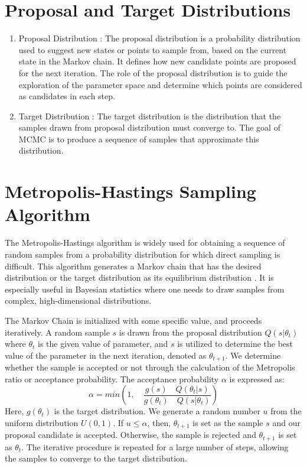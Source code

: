 \documentclass{article}
\begin{document}
\section{Proposal and Target Distributions}

\begin{enumerate}
    \item Proposal Distribution :
    The proposal distribution is a probability distribution used to suggest new states or points to sample from, based on the current state in the Markov chain. It defines how new candidate points are proposed for the next iteration. The role of the proposal distribution is to guide the exploration of the parameter space and determine which points are considered as candidates in each step.

    \item Target Distribution :
    The target distribution is the distribution that the samples drawn from proposal distribution must converge to. The goal of MCMC is to produce a sequence of samples that approximate this distribution.
\end{enumerate}

\section{Metropolis-Hastings Sampling Algorithm}
The Metropolis-Hastings algorithm is widely used for obtaining a sequence of random samples from a probability distribution for which direct sampling is difficult. This algorithm generates a Markov chain that has the desired distribution or the target distribution as its equilibrium distribution \cite{bailer2017practical,bolstad2016introduction}. It is especially useful in Bayesian statistics where one needs to draw samples from complex, high-dimensional distributions.

The Markov Chain is initialized with some specific value, and proceeds iteratively. A random sample $s$ is drawn from the proposal distribution $Q(s|\theta_t)$ where $\theta_t$ is the given value of parameter, and $s$ is utilized to determine the best value of the parameter in the next iteration, denoted as $\theta_{t+1}$. We determine whether the sample is accepted or not through the calculation of the Metropolis ratio or acceptance probability. The acceptance probability $\alpha$ is expressed as:
\begin{equation}
\alpha = min\left( 1, \quad \frac{g(s) \quad Q(\theta_t|s)}{g(\theta_t) \quad Q(s|\theta_t)} \right) \label{eq:mhalg}
\end{equation}
Here, $g(\theta_t)$ is the target distribution. We generate a random number $u$ from the uniform distribution $U(0,1)$. If $u \leq \alpha$, then, $\theta_{t+1}$ is set as the sample $s$ and our proposal candidate is accepted. Otherwise, the sample is rejected and $\theta_{t+1}$ is set as $\theta_t$. The iterative procedure is repeated for a large number of steps, allowing the samples to converge to the target distribution. 
\end{document}
